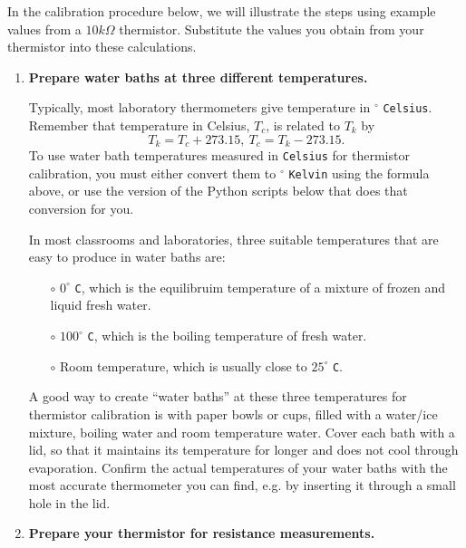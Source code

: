 In the calibration procedure below, we will illustrate the steps using example values from a $10k\Omega$ thermistor. 
Substitute the values you obtain from your thermistor into these calculations.
\begin{enumerate}
	\item \textbf{Prepare water baths at three different temperatures.}
	
	Typically, most laboratory thermometers give temperature in $^\circ$ \texttt{Celsius}.
	Remember that temperature in Celsius, $T_c$, is related to $T_k$ by 
	\begin{equation*}
		T_k = T_c + 273.15, ~T_c = T_k - 273.15.
	\end{equation*}
	To use water bath temperatures measured in \texttt{Celsius} for thermistor calibration, you must either convert them to $^\circ$ \texttt{Kelvin} using the formula above, or use the version of the Python scripts below that does that conversion for you.
	
	\smallskip
	In most classrooms and laboratories, three suitable temperatures that are easy to produce in water baths are:
	\begin{itemize}
		\item[$\circ$] $0^\circ$ \texttt{C}, which is the equilibruim temperature of a mixture of frozen and liquid fresh water. 		
		\item[$\circ$] $100^\circ$ \texttt{C}, which is the boiling temperature of fresh water. 
		\item[$\circ$] Room temperature, which is usually close to $25^\circ$ \texttt{C}.
	\end{itemize} 

	A good way to create ``water baths'' at these three temperatures for thermistor calibration is with paper bowls or cups, filled with a water/ice mixture, boiling water and room temperature water.
	Cover each bath with a lid, so that it maintains its temperature for longer and does not cool through evaporation. 
	Confirm the actual temperatures of your water baths with the most accurate thermometer you can find, e.g. by inserting it through a small hole in the lid.
	
	\item \textbf{Prepare your thermistor for resistance measurements.}
	

\end{enumerate}
